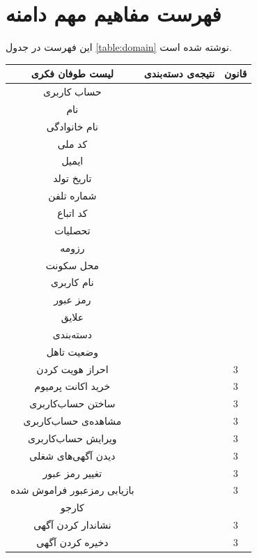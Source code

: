 \section{فهرست مفاهیم مهم دامنه}
این فهرست در جدول \ref{table:domain} نوشته شده است.

\begin{longtable}{|c|c|c|}
	\hline		لیست طوفان فکری &		نتیجه‌ی دسته‌بندی &		قانون \\
	\hline
	\hline		حساب کاربری &
	\myc &
	\onealef \\
	\hline		نام &
	\mya &
	\oneh \\
	\hline		نام خانوادگی &
	\mya &
	\oneh \\
	\hline		کد ملی &
	\mya &
	\oneh \\
	\hline		ایمیل &
	\mya &
	\oneh \\
	\hline		تاریخ تولد &
	\mya &
	\oneh \\
	\hline		شماره تلفن &
	\mya &
	\oneh \\
	\hline		کد اتباع &
	\mya &
	\oneh \\
	\hline		تحصلیات &
	\myc &
	\onej \\
	\hline		رزومه &
	\mya &
	\oneh \\
	\hline		محل سکونت &
	\mya &
	\oneh \\
	\hline		نام کاربری &
	\mya &
	\oneh \\
	\hline		رمز عبور &
	\mya &
	\oneh \\
	\hline		علایق &
	\myc &
	\onej \\
	\hline		دسته‌بندی&
	\myc &
	\onej \\
	\hline		وضعیت تاهل &
	\mya &
	\oneh \\
	\hline		احراز هویت کردن &
	\asus &
	3 \\
	\hline		خرید اکانت پرمیوم &
	\asus &
	3 \\
	\hline		ساختن حساب‌کاربری &
	\asus &
	3 \\
	\hline		مشاهده‌ی حساب‌کاربری &
	\asus &
	3 \\
	\hline		ویرایش حساب‌‌کاربری &
	\asus &
	3 \\
	\hline		دیدن آگهی‌های شغلی &
	\asus &
	3 \\
	\hline		تغییر رمز عبور &
	\asus &
	3 \\
	\hline		بازیابی رمزعبور فراموش شده &
	\asus &
	3 \\
	\hline		کارجو &
	\myc &
	\oned \\
	\hline
	نشاندار کردن آگهی		&
	\asjs &
	3 \\
	\hline
	دخیره کردن آگهی &
	\asjs &
	3 \\

\end{longtable}
